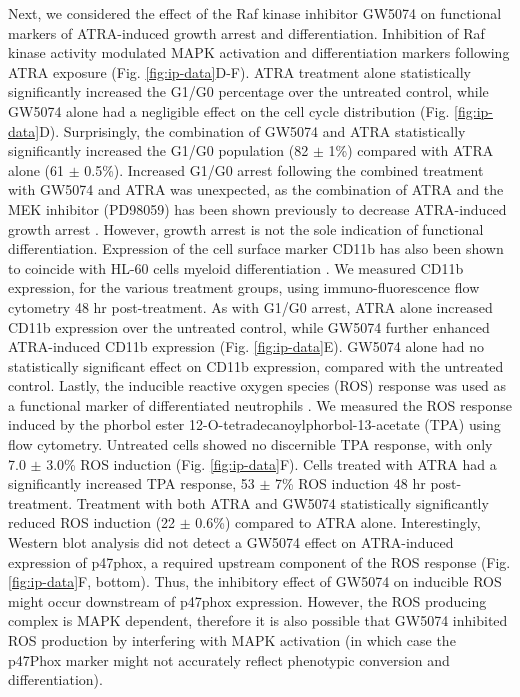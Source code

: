 \documentclass[12pt]{article}
\begin{document}
Next, we considered the effect of the Raf kinase inhibitor GW5074 on functional markers of ATRA-induced growth arrest and differentiation.
Inhibition of Raf kinase activity modulated MAPK activation and differentiation markers following ATRA exposure (Fig. \ref{fig:ip-data}D-F).
ATRA treatment alone statistically significantly increased the G1/G0 percentage over the untreated control,
while GW5074 alone had a negligible effect on the cell cycle distribution (Fig. \ref{fig:ip-data}D).
Surprisingly, the combination of GW5074 and ATRA statistically significantly increased the G1/G0 population (82 $\pm$ 1\%)
compared with ATRA alone (61 $\pm$ 0.5\%).
Increased G1/G0 arrest following the combined treatment with GW5074 and ATRA was unexpected,
as the combination of ATRA and the MEK inhibitor (PD98059) has been shown previously to decrease ATRA-induced growth arrest \cite{Yen1998}.
However, growth arrest is not the sole indication of functional differentiation.
Expression of the cell surface marker CD11b has also been shown to coincide with HL-60 cells myeloid differentiation \cite{Hickstein1989}.
We measured CD11b expression, for the various treatment groups, using immuno-fluorescence flow cytometry 48 hr post-treatment.
As with G1/G0 arrest, ATRA alone increased CD11b expression over the untreated control,
while GW5074 further enhanced ATRA-induced CD11b expression (Fig. \ref{fig:ip-data}E).
GW5074 alone had no statistically significant effect on CD11b expression, compared with the untreated control.
Lastly, the inducible reactive oxygen species (ROS) response was used as a functional marker of differentiated neutrophils \cite{Congleton2011}.
We measured the ROS response induced by the phorbol ester 12-O-tetradecanoylphorbol-13-acetate (TPA) using flow cytometry.
Untreated cells showed no discernible TPA response,
with only 7.0 $\pm$ 3.0\% ROS induction (Fig. \ref{fig:ip-data}F).
Cells treated with ATRA had a significantly increased TPA response, 53 $\pm$ 7\% ROS induction 48 hr post-treatment.
Treatment with both ATRA and GW5074 statistically significantly reduced ROS induction (22 $\pm$ 0.6\%) compared to ATRA alone.
Interestingly, Western blot analysis did not detect a GW5074 effect on ATRA-induced expression of p47phox,
a required upstream component of the ROS response  (Fig. \ref{fig:ip-data}F, bottom).
Thus, the inhibitory effect of GW5074 on inducible ROS might occur downstream of p47phox expression.
However, the ROS producing complex is MAPK dependent,
therefore it is also possible that GW5074 inhibited ROS production by interfering
with MAPK activation (in which case the p47Phox marker might not accurately reflect phenotypic conversion and differentiation).
\end{document}
